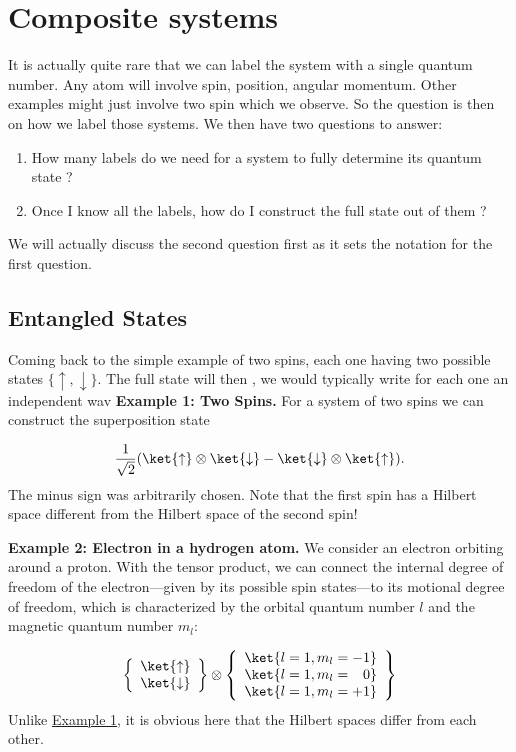 \section{Composite systems}
It is actually quite rare that we can label the system with a single quantum number. Any atom will involve spin, position, angular momentum. Other examples might just involve two spin which we observe. So the question is then on how we label those systems. We then have two questions to answer:
\begin{enumerate}
\item How many labels do we need for a system to fully determine its quantum state ?
\item Once I know all the labels, how do I construct the full state out of them ?
\end{enumerate}
We will actually discuss the second question first as it sets the notation for the first question.



\subsection{Entangled States}
 
Coming back to the simple example of two spins, each one having two possible states $\{\uparrow, \downarrow\}$. The full state will then 
, we would typically write for each one an independent wav 
 \textbf{Example 1: Two Spins.}\label{sec:examplespin}  For a system of two spins we can construct the superposition state

\begin{align}
						\frac{1}{\sqrt{2}}(\ket{\uparrow}\otimes\ket{\downarrow}-\ket{\downarrow}\otimes\ket{\uparrow}).
					
\end{align}
	The minus sign was arbitrarily chosen.
					Note that the first spin has a Hilbert space different from the Hilbert space of the second spin!
					
					
\textbf{Example 2: Electron in a hydrogen atom.} We consider an electron orbiting around a proton. With the tensor product, we can connect the internal degree of freedom of the electron---given by its possible spin states---to its motional degree of freedom, which is characterized by the orbital quantum number $l$ and the magnetic quantum number $m_l$:

\begin{align}
						\left\{

\begin{array}
{c} \ket{\uparrow} \\ \ket{\downarrow} \end{array}
 \right\} \otimes \left\{

\begin{array}
{c} \ket{l=1,m_l=-1} \\ \ket{l=1,m_l=\enspace \; 0} \\ \ket{l=1,m_l=+1}  \end{array}
 \right\}
					
\end{align}
Unlike \hyperref[sec:examplespin]{Example 1}, it is obvious here that the Hilbert spaces differ from each other. 
 
